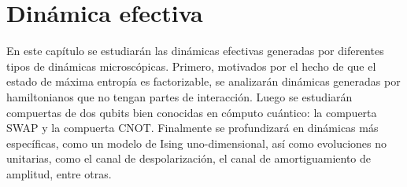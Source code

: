 \chapter{Dinámica efectiva}

En este capítulo se estudiarán las dinámicas efectivas generadas  por diferentes tipos de dinámicas microscópicas. Primero, motivados por el hecho de que el estado de máxima entropía es factorizable, se analizarán dinámicas generadas por hamiltonianos que no tengan partes de interacción. Luego se estudiarán compuertas de dos qubits bien conocidas en cómputo cuántico: la compuerta SWAP y la compuerta CNOT. Finalmente se profundizará en dinámicas más específicas, como un modelo de Ising uno-dimensional, así como evoluciones no unitarias, como el canal de despolarización, el canal de amortiguamiento de amplitud, entre otras.




\newpage